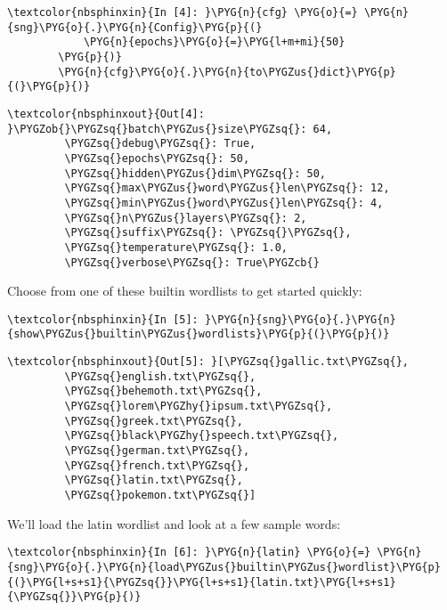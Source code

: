 \documentclass[letterpaper,10pt,english]{sphinxmanual}
\begin{document}
%
\begin{Verbatim}[commandchars=\\\{\}]
\textcolor{nbsphinxin}{In [4]: }\PYG{n}{cfg} \PYG{o}{=} \PYG{n}{sng}\PYG{o}{.}\PYG{n}{Config}\PYG{p}{(}
            \PYG{n}{epochs}\PYG{o}{=}\PYG{l+m+mi}{50}
        \PYG{p}{)}
        \PYG{n}{cfg}\PYG{o}{.}\PYG{n}{to\PYGZus{}dict}\PYG{p}{(}\PYG{p}{)}
\end{Verbatim}

%
\begin{Verbatim}[commandchars=\\\{\}]
\textcolor{nbsphinxout}{Out[4]: }\PYGZob{}\PYGZsq{}batch\PYGZus{}size\PYGZsq{}: 64,
         \PYGZsq{}debug\PYGZsq{}: True,
         \PYGZsq{}epochs\PYGZsq{}: 50,
         \PYGZsq{}hidden\PYGZus{}dim\PYGZsq{}: 50,
         \PYGZsq{}max\PYGZus{}word\PYGZus{}len\PYGZsq{}: 12,
         \PYGZsq{}min\PYGZus{}word\PYGZus{}len\PYGZsq{}: 4,
         \PYGZsq{}n\PYGZus{}layers\PYGZsq{}: 2,
         \PYGZsq{}suffix\PYGZsq{}: \PYGZsq{}\PYGZsq{},
         \PYGZsq{}temperature\PYGZsq{}: 1.0,
         \PYGZsq{}verbose\PYGZsq{}: True\PYGZcb{}
\end{Verbatim}

Choose from one of these builtin wordlists to get started quickly:

%
\begin{Verbatim}[commandchars=\\\{\}]
\textcolor{nbsphinxin}{In [5]: }\PYG{n}{sng}\PYG{o}{.}\PYG{n}{show\PYGZus{}builtin\PYGZus{}wordlists}\PYG{p}{(}\PYG{p}{)}
\end{Verbatim}

%
\begin{Verbatim}[commandchars=\\\{\}]
\textcolor{nbsphinxout}{Out[5]: }[\PYGZsq{}gallic.txt\PYGZsq{},
         \PYGZsq{}english.txt\PYGZsq{},
         \PYGZsq{}behemoth.txt\PYGZsq{},
         \PYGZsq{}lorem\PYGZhy{}ipsum.txt\PYGZsq{},
         \PYGZsq{}greek.txt\PYGZsq{},
         \PYGZsq{}black\PYGZhy{}speech.txt\PYGZsq{},
         \PYGZsq{}german.txt\PYGZsq{},
         \PYGZsq{}french.txt\PYGZsq{},
         \PYGZsq{}latin.txt\PYGZsq{},
         \PYGZsq{}pokemon.txt\PYGZsq{}]
\end{Verbatim}

We’ll load the latin wordlist and look at a few sample words:

%
\begin{Verbatim}[commandchars=\\\{\}]
\textcolor{nbsphinxin}{In [6]: }\PYG{n}{latin} \PYG{o}{=} \PYG{n}{sng}\PYG{o}{.}\PYG{n}{load\PYGZus{}builtin\PYGZus{}wordlist}\PYG{p}{(}\PYG{l+s+s1}{\PYGZsq{}}\PYG{l+s+s1}{latin.txt}\PYG{l+s+s1}{\PYGZsq{}}\PYG{p}{)}
\end{Verbatim}
\end{document}
